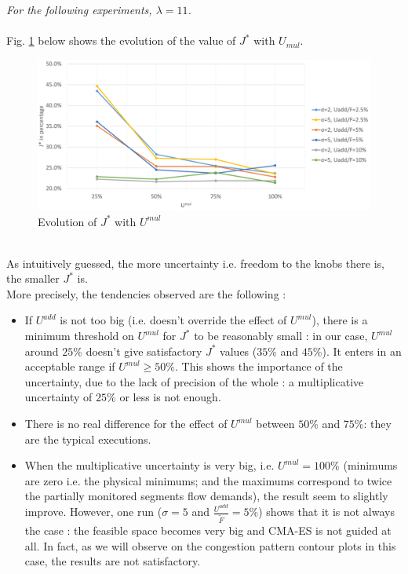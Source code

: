 \emph{For the following experiments, $\lambda=11$.}\\
\\
Fig. \ref{fig:umulevolution} below shows the evolution of the value of $J^{*}$ with $U_{mul}$.
\begin{figure}[!h]
	\centering
	\caption{Evolution of $J^{*}$ with $U^{mul}$}
	\label{fig:umulevolution}
	\includegraphics[width=7in]{figures/umul.png}
\end{figure}\\
As intuitively guessed, the more uncertainty i.e. freedom to the knobs there is, the smaller $J^{*}$ is.\\
More precisely, the tendencies observed are the following :
\begin{itemize}
	\item If $U^{add}$ is not too big (i.e. doesn't override the effect of $U^{mul}$), there is a minimum threshold on $U^{mul}$ for $J^{*}$ to be reasonably small : in our case, $U^{mul}$ around $25\% $ doesn't give satisfactory $J^{*}$ values ($35\% $ and $45\% $). It enters in an acceptable range if $U^{mul}\geq 50\% $. This shows the importance of the uncertainty, due to the lack of precision of the whole : a multiplicative uncertainty of $25\% $ or less is not enough.
	\item There is no real difference for the effect of $U^{mul}$ between $50\% $ and $75\% $: they are the typical executions.
	\item When the multiplicative uncertainty is very big, i.e. $U^{mul}=100\% $ (minimums are zero i.e. the physical minimums; and the maximums correspond to twice the partially monitored segments flow demands), the result seem to slightly improve. However, one run ($\sigma=5$ and $\frac{U^{add}}{\widetilde{F}}=5\% $) shows that it is not always the case :  the feasible space becomes very big and CMA-ES is not guided at all. In fact, as we will observe on the congestion pattern contour plots in this case, the results are not satisfactory.
\end{itemize} 

